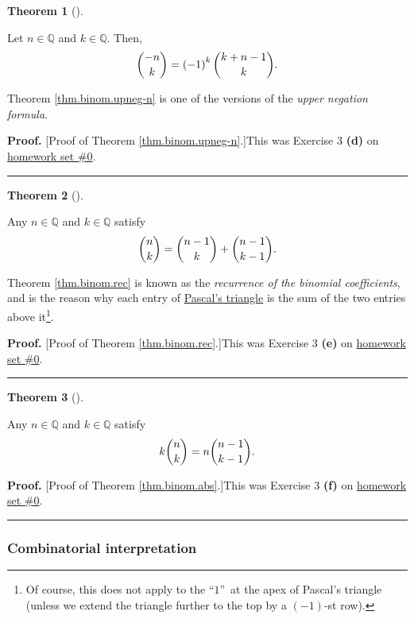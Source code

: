 \documentclass[numbers=enddot,12pt,final,onecolumn,notitlepage]{scrartcl}%
\numberwithin{exer}{subsection}
\theoremstyle{definition}
\newtheorem{theo}{Theorem}[subsection]
\newenvironment{theorem}[1][]
{\begin{theo}[#1]\begin{leftbar}}
{\end{leftbar}\end{theo}}
\newenvironment{proof}[1][Proof]{\noindent\textbf{#1.} }{\ \rule{0.5em}{0.5em}}
\begin{document}
\begin{theorem}
\label{thm.binom.upneg-n}Let $n\in\mathbb{Q}$ and $k\in\mathbb{Q}$. Then,%
\[
\dbinom{-n}{k}=\left(  -1\right)  ^{k}\dbinom{k+n-1}{k}.
\]

\end{theorem}

Theorem \ref{thm.binom.upneg-n} is one of the versions of the \textit{upper
negation formula}.

\begin{proof}
[Proof of Theorem \ref{thm.binom.upneg-n}.]This was Exercise 3 \textbf{(d)} on
\href{http://www-users.math.umn.edu/~dgrinber/19s/hw0s.pdf}{homework set \#0}.
\end{proof}

\begin{theorem}
\label{thm.binom.rec}Any $n\in\mathbb{Q}$ and $k\in\mathbb{Q}$ satisfy
\[
\dbinom{n}{k}=\dbinom{n-1}{k}+\dbinom{n-1}{k-1}.
\]

\end{theorem}

Theorem \ref{thm.binom.rec} is known as the \textit{recurrence of the binomial
coefficients}, and is the reason why each entry of
\href{https://en.wikipedia.org/wiki/Pascal%27s_triangle}{Pascal's triangle} is
the sum of the two entries above it\footnote{Of course, this does not apply to
the \textquotedblleft$1$\textquotedblright\ at the apex of Pascal's triangle
(unless we extend the triangle further to the top by a $\left(  -1\right)
$-st row).}.

\begin{proof}
[Proof of Theorem \ref{thm.binom.rec}.]This was Exercise 3 \textbf{(e)} on
\href{http://www-users.math.umn.edu/~dgrinber/19s/hw0s.pdf}{homework set \#0}.
\end{proof}

\begin{theorem}
\label{thm.binom.abs}Any $n\in\mathbb{Q}$ and $k\in\mathbb{Q}$ satisfy
\[
k\dbinom{n}{k}=n\dbinom{n-1}{k-1}.
\]

\end{theorem}

\begin{proof}
[Proof of Theorem \ref{thm.binom.abs}.]This was Exercise 3 \textbf{(f)} on
\href{http://www-users.math.umn.edu/~dgrinber/19s/hw0s.pdf}{homework set \#0}.
\end{proof}

\subsubsection{Combinatorial interpretation}
\end{document}
